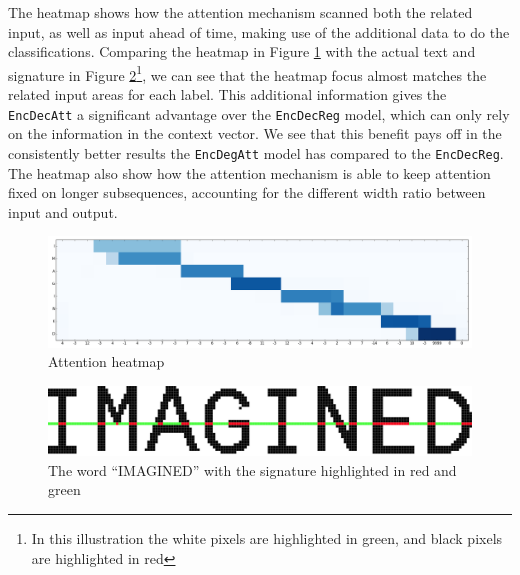 The heatmap shows how the attention mechanism scanned both the related input, as well as input ahead of time, making use of the additional data to do the classifications. Comparing the heatmap in Figure \ref{fig:attention_heatmap} with the actual text and signature in Figure  \ref{fig:imagine_highlighted}\footnote{In this illustration the white pixels are highlighted in green, and black pixels are highlighted in red}, we can see that the heatmap focus almost matches the related input areas for each label. This additional information gives the {\tt EncDecAtt} a significant advantage over the {\tt EncDecReg} model, which can only rely on the information in the context vector. We see that this benefit pays off in the consistently better results the {\tt EncDegAtt} model has compared to the {\tt EncDecReg}. The heatmap also show how the attention mechanism is able to keep attention fixed on longer subsequences, accounting for the different width ratio between input and output.

\begin{figure}[ht]
    \centering
    \includegraphics[width=1\textwidth]{fig/conclusion/attention_crop.png}
    \caption{Attention heatmap}
    \label{fig:attention_heatmap}
\end{figure}

\begin{figure}[ht]
    \centering
    \includegraphics[width=1\textwidth]{fig/conclusion/imagined_grid_exported.png}
    \caption{The word ``IMAGINED'' with the signature highlighted in red and green}
    \label{fig:imagine_highlighted}
\end{figure}
